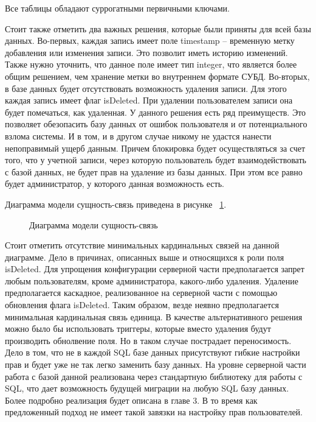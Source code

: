 Все таблицы обладают суррогатными первичными ключами.

Стоит также отметить два важных решения, которые были приняты для всей базы данных.
Во-первых, каждая запись имеет поле timestamp -- временную метку добавления или изменения записи.
Это позволит иметь историю изменений. Также нужно уточнить, что данное поле имеет тип integer,
что является более общим решением, чем хранение метки во внутреннем формате СУБД.
Во-вторых, в базе данных будет отсутствовать возможность удаления записи. Для этого каждая
запись имеет флаг isDeleted. При удалении пользователем записи она будет помечаться, как удаленная.
У данного решения есть ряд преимуществ. Это позволяет обезопасить базу данных от ошибок пользователя
и от потенциального взлома системы. И в том, и в другом случае никому не удастся нанести
непоправимый ущерб данным. Причем блокировка будет осуществляться за счет того, что у учетной записи,
через которую пользователь будет взаимодействовать с базой данных, не будет прав на удаление из базы данных.
При этом все равно будет администратор, у которого данная возможность есть.

Диаграмма модели сущность-связь приведена в рисунке ~\ref{ris:ermodel}.

\begin{figure}[h!]
    \caption{Диаграмма модели сущность-связь}
    \label{ris:ermodel}
\end{figure}

Стоит отметить отсутствие минимальных кардинальных связей на данной диаграмме. Дело в причинах, описанных выше и 
относящихся к роли поля isDeleted. Для упрощения конфигурации серверной части предполагается запрет любым пользователям,
кроме администратора, какого-либо удаления. Удаление предполагается каскадное, реализованное на серверной части
с помощью обновления флага isDeleted. Таким образом, везде неявно предполагается минимальная кардинальная связь единица.
В качестве альтернативного решения можно было бы использовать триггеры, которые вместо удаления будут
производить обнолвение поля. Но в таком случае пострадает переносимость. Дело в том, что не в каждой
SQL базе данных присутствуют гибкие настройки прав и будет уже не так легко заменить базу данных.
На уровне серверной части работа с базой данной реализована через стандартную библиотеку для работы с
SQL, что дает возможность будущей миграции на любую SQL базу данных. Более подробно реализация будет описана в главе 3.
В то время как предложенный подход не имеет такой завязки на настройку прав пользователей.

